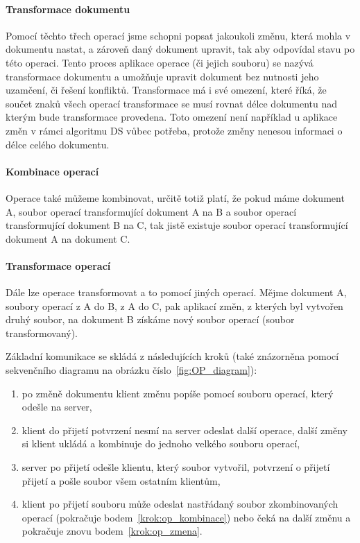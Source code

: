 \paragraph{Transformace dokumentu}
Pomocí těchto třech operací jsme schopni popsat jakoukoli změnu, která mohla v dokumentu nastat, a zároveň daný dokument upravit, tak aby odpovídal stavu po této operaci.
Tento proces aplikace operace (či jejich souboru) se nazývá transformace dokumentu a umožňuje upravit dokument bez nutnosti jeho uzamčení, či řešení konfliktů.
Transformace má i své omezení, které říká, že součet znaků všech operací transformace se musí rovnat délce dokumentu nad kterým bude transformace provedena.
Toto omezení není například u aplikace změn v rámci algoritmu \gls{DS} vůbec potřeba, protože změny nenesou informaci o délce celého dokumentu.

\paragraph{Kombinace operací}
Operace také můžeme kombinovat, určitě totiž platí, že pokud máme dokument A, soubor operací transformující dokument A na B a soubor operací transformující dokument B na C, tak jistě existuje soubor operací transformující dokument A na dokument C.

\paragraph{Transformace operací}
Dále lze operace transformovat a to pomocí jiných operací.
Mějme dokument A, soubory operací z A do B, z A do C, pak aplikací změn, z kterých byl vytvořen druhý soubor, na dokument B získáme nový soubor operací (soubor transformovaný).~\cite{ot:codecommit}

Základní komunikace se skládá z následujících kroků (také znázorněna pomocí sekvenčního diagramu na obrázku číslo~\ref{fig:OP_diagram}):

\begin{enumerate}
    \item po změně dokumentu klient změnu popíše pomocí souboru operací, který odešle na server,\label{krok:op_zmena}
    \item klient do přijetí potvrzení nesmí na server odeslat další operace, další změny si klient ukládá a kombinuje do jednoho velkého souboru operací,\label{krok:op_kombinace}
    \item server po přijetí odešle klientu, který soubor vytvořil, potvrzení o přijetí přijetí a pošle soubor všem ostatním klientům,
    \item klient po přijetí souboru může odeslat nastřádaný soubor zkombinovaných operací (pokračuje bodem~\ref{krok:op_kombinace}) nebo čeká na další změnu a pokračuje znovu bodem~\ref{krok:op_zmena}.~\cite{ot:waveAddition}
\end{enumerate}

